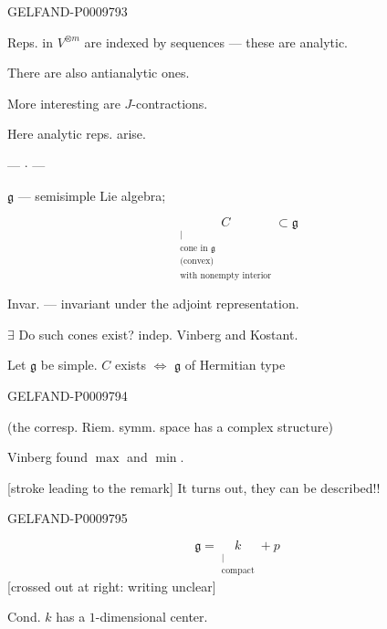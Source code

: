 \begin{GelfandAdjacentEvidence}{GELFAND-P000979}{3}


Reps. in $V^{\otimes m}$ are indexed by sequences --- these are analytic.

There are also antianalytic ones.

More interesting are $J$-contractions.

Here analytic reps. arise.

\begin{center}--- \(\cdot\) ---\end{center}

$\mathfrak g$ --- semisimple Lie algebra;

\[
 \underset{\substack{|\\\text{cone in }\mathfrak g\\\text{(convex)}\\\text{with nonempty interior}}}{C}\subset\mathfrak g
\]

Invar. --- invariant under the adjoint representation.

$\exists$ Do such cones exist? indep. Vinberg and Kostant.

Let $\mathfrak g$ be simple. $C$ exists $\Leftrightarrow$ $\mathfrak g$ of Hermitian type
\end{GelfandAdjacentEvidence}
\begin{GelfandAdjacentEvidence}{GELFAND-P000979}{4}


(the corresp. Riem. symm. space has a complex structure)

Vinberg found $\max$ and $\min$.

[stroke leading to the remark] It turns out, they can be described!!
\end{GelfandAdjacentEvidence}
\begin{GelfandAdjacentEvidence}{GELFAND-P000979}{5}


\[
 \mathfrak g=\underset{\substack{|\\\text{compact}}}{k}+p
\]
[crossed out at right: writing unclear]
\end{GelfandAdjacentEvidence}


Cond. $k$ has a $1$-dimensional center.

